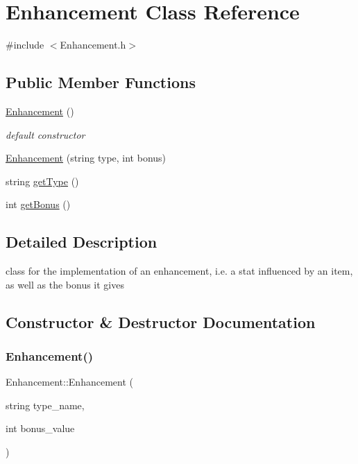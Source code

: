 \hypertarget{class_enhancement}{}\section{Enhancement Class Reference}
\label{class_enhancement}


{\ttfamily \#include $<$Enhancement.\+h$>$}

\subsection*{Public Member Functions}
\begin{DoxyCompactItemize}
\item 
\hypertarget{class_enhancement_ab348c08841ab57c76daa7c3eab2ad4a3}{}\label{class_enhancement_ab348c08841ab57c76daa7c3eab2ad4a3} 
\hyperlink{class_enhancement_ab348c08841ab57c76daa7c3eab2ad4a3}{Enhancement} ()
\begin{DoxyCompactList}\small\item\em default constructor \end{DoxyCompactList}\item 
\hyperlink{class_enhancement_a808475a07d34038bdccd59e69d8ad2df}{Enhancement} (string type, int bonus)
\item 
string \hyperlink{class_enhancement_abcdde9da0542f751301f4ddf1809a1cc}{get\+Type} ()
\item 
int \hyperlink{class_enhancement_afd0ea7d414468cf507a4673fd066fd89}{get\+Bonus} ()
\end{DoxyCompactItemize}


\subsection{Detailed Description}
class for the implementation of an enhancement, i.\+e. a stat influenced by an item, as well as the bonus it gives 

\subsection{Constructor \& Destructor Documentation}
\hypertarget{class_enhancement_a808475a07d34038bdccd59e69d8ad2df}{}\label{class_enhancement_a808475a07d34038bdccd59e69d8ad2df} 
\subsubsection{\texorpdfstring{Enhancement()}{Enhancement()}}
{\footnotesize\ttfamily Enhancement\+::\+Enhancement (\begin{DoxyParamCaption}\item[{string}]{type\+\_\+name,  }\item[{int}]{bonus\+\_\+value }\end{DoxyParamCaption})}

